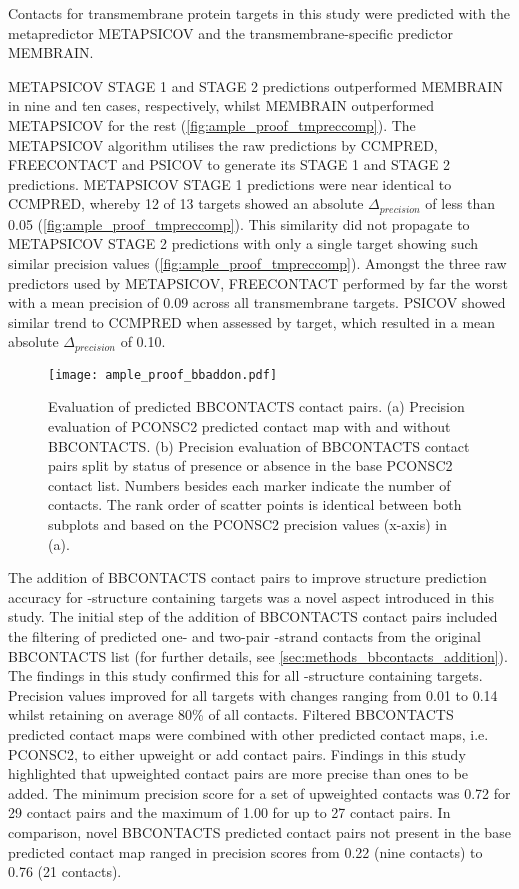Contacts for transmembrane protein targets in this study were predicted with the metapredictor METAPSICOV and the transmembrane-specific predictor MEMBRAIN.

METAPSICOV STAGE 1 and STAGE 2 predictions outperformed MEMBRAIN in nine and ten cases, respectively, whilst MEMBRAIN outperformed METAPSICOV for the rest (\cref{fig:ample_proof_tmpreccomp}). The METAPSICOV algorithm utilises the raw predictions by CCMPRED, FREECONTACT and PSICOV to generate its STAGE 1 and STAGE 2 predictions. METAPSICOV STAGE 1 predictions were near identical to CCMPRED, whereby 12 of 13 targets showed an absolute $\Delta_{precision}$ of less than 0.05 (\cref{fig:ample_proof_tmpreccomp}). This similarity did not propagate to METAPSICOV STAGE 2 predictions with only a single target showing such similar precision values (\cref{fig:ample_proof_tmpreccomp}). Amongst the three raw predictors used by METAPSICOV, FREECONTACT performed by far the worst with a mean precision of 0.09 across all transmembrane targets. PSICOV showed similar trend to CCMPRED when assessed by target, which resulted in a mean absolute $\Delta_{precision}$ of 0.10.

\begin{figure}[H]
    \centering
    \texttt{[image: ample\_proof\_bbaddon.pdf]}
    \caption[Evaluation of BBCONTACTS contact pairs]{Evaluation of predicted BBCONTACTS contact pairs. (a) Precision evaluation of PCONSC2 predicted contact map with and without BBCONTACTS. (b) Precision evaluation of BBCONTACTS contact pairs split by status of presence or absence in the base PCONSC2 contact list. Numbers besides each marker indicate the number of contacts. The rank order of scatter points is identical between both subplots and based on the PCONSC2 precision values (x-axis) in (a).}
    \label{fig:ample_proof_bbaddon}
\end{figure}

The addition of BBCONTACTS contact pairs to improve structure prediction accuracy for \textbeta-structure containing targets was a novel aspect introduced in this study. The initial step of the addition of BBCONTACTS contact pairs included the filtering of predicted one- and two-pair \textbeta-strand contacts from the original BBCONTACTS list (for further details, see \cref{sec:methods_bbcontacts_addition}). The findings in this study confirmed this for all \textbeta-structure containing targets. Precision values improved for all targets with changes ranging from 0.01 to 0.14 whilst retaining on average 80\% of all contacts. Filtered BBCONTACTS predicted contact maps were combined with other predicted contact maps, i.e. PCONSC2, to either upweight or add contact pairs. Findings in this study highlighted that upweighted contact pairs are more precise than ones to be added. The minimum precision score for a set of upweighted contacts was 0.72 for 29 contact pairs and the maximum of 1.00 for up to 27 contact pairs. In comparison, novel BBCONTACTS predicted contact pairs not present in the base predicted contact map ranged in precision scores from 0.22 (nine contacts) to 0.76 (21 contacts). 

